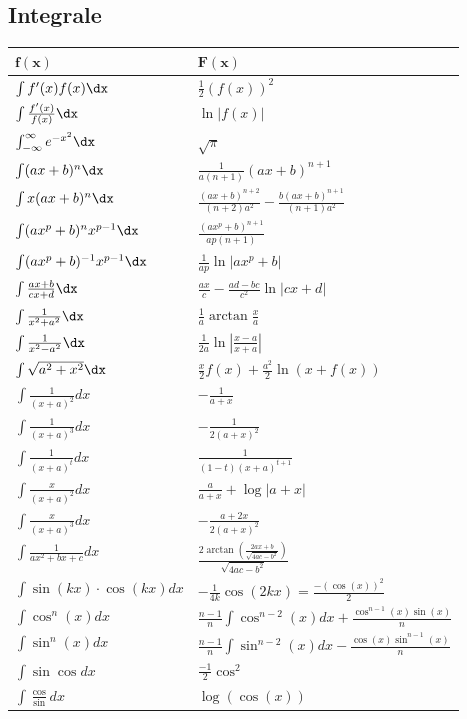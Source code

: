 \subsection{Integrale}
\begin{center}
 \begin{tabularx}{\linewidth}{>{\centering\arraybackslash}X>{\centering\arraybackslash}X}
  \toprule
  $\mathbf{f(x)}$ & $\mathbf{F(x)}$ \\
  \midrule
  $\int f'(x) f(x) \dx$ & $\frac{1}{2}(f(x))^2$ \\
  $\int \frac{f'(x)}{f(x)} \dx$ & $\ln|f(x)|$ \\
  $\int_{-\infty}^\infty e^{-x^2} \dx$ & $\sqrt{\pi}$ \\
  $\int (ax+b)^n \dx$ & $\frac{1}{a(n+1)}(ax+b)^{n+1}$ \\
  $\int x(ax+b)^n \dx$ & $\frac{(ax+b)^{n+2}}{(n+2)a^2} - \frac{b(ax+b)^{n+1}}{(n+1)a^2}$ \\
  $\int (ax^p+b)^n x^{p-1} \dx$ & $\frac{(ax^p+b)^{n+1}}{ap(n+1)}$ \\
  $\int (ax^p + b)^{-1} x^{p-1} \dx$ & $\frac{1}{ap} \ln |ax^p + b|$ \\
  $\int \frac{ax+b}{cx+d} \dx$ & $\frac{ax}{c} - \frac{ad-bc}{c^2} \ln |cx +d|$ \\
  $\int \frac{1}{x^2+a^2} \dx$ & $\frac{1}{a} \arctan \frac{x}{a}$ \\
  $\int \frac{1}{x^2 - a^2} \dx$ & $\frac{1}{2a} \ln\left| \frac{x-a}{x+a} \right|$ \\
  $\int \sqrt{a^2+x^2} \dx $ & $\frac{x}{2}f(x) + \frac{a^2}{2}\ln(x+f(x))$ \\

   
   
   
  $\int \frac{1}{(x+a)^2}dx$& $-\frac{1}{a+x}$ \\
$\int \frac{1}{(x+a)^3}dx$& $-\frac{1}{2(a+x)^2}$ \\
$\int \frac{1}{(x+a)^t}dx$& $\frac{1}{(1-t)(x+a)^{t+1}}$ \\
$\int \frac{x}{(x+a)^2}dx$& $\frac{a}{a+x}+\log |a+x|$ \\
$\int \frac{x}{(x+a)^3}dx$& $-\frac{a+2x}{2(a+x)^2}$ \\
$\int \frac{1}{ax^2+bx+c}dx$& $\frac{2 \arctan\left(\frac{2ax+b}{\sqrt{4ac-b^2}} \right)}{\sqrt{4ac-b^2}}$\\

  $\int \sin(kx)\cdot \cos(kx)dx$ & $-\frac{1}{4k}\cos(2kx)=\frac{-(\cos(x))^2}{2}$\\
  


 $\int \cos^n(x) d x$ & $\frac{n-1}{n} \int \cos^{n-2}(x) d x+\frac{\cos^{n-1}(x) \sin (x)}{n}$ \\
$ \int \sin^n(x) d x $ & $\frac{n-1}{n} \int \sin ^{n-2}(x) d x-\frac{\cos (x) \sin ^{n-1}(x)}{n}$\\


$\int \sin \cos dx$ & $\frac{-1}{2}\cos^2$\\
  $\int \frac{\cos}{ \sin} dx$ & $\log(\cos(x))$\\
  
  \bottomrule
 \end{tabularx}
\end{center}
